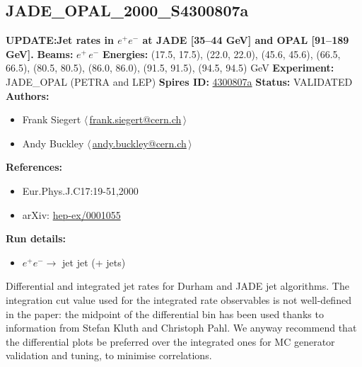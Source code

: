 
\clearpage

\subsection[JADE\_OPAL\_2000\_S4300807a]{JADE\_OPAL\_2000\_S4300807a\,\cite{Pfeifenschneider:1999rz}}
\textbf{UPDATE:Jet rates in $e^+e^-$ at JADE [35--44 GeV] and OPAL [91--189 GeV].}\newline
\textbf{Beams:} $e^+$\,$e^-$ \newline
\textbf{Energies:} (17.5, 17.5), (22.0, 22.0), (45.6, 45.6), (66.5, 66.5), (80.5, 80.5), (86.0, 86.0), (91.5, 91.5), (94.5, 94.5) GeV \newline
\textbf{Experiment:} JADE_OPAL (PETRA and LEP)\newline
\textbf{Spires ID:} \href{http://inspire-hep.net/search?p=find+key+4300807a}{4300807a}\newline
\textbf{Status:} VALIDATED\newline
\textbf{Authors:}
\begin{itemize}
  \item Frank Siegert $\langle\,$\href{mailto:frank.siegert@cern.ch}{frank.siegert@cern.ch}$\,\rangle$
  \item Andy Buckley $\langle\,$\href{mailto:andy.buckley@cern.ch}{andy.buckley@cern.ch}$\,\rangle$
\end{itemize}
\textbf{References:}
\begin{itemize}
  \item Eur.Phys.J.C17:19-51,2000
  \item arXiv: \href{http://arxiv.org/abs/hep-ex/0001055}{hep-ex/0001055}
\end{itemize}
\textbf{Run details:}
\begin{itemize}
\item $e^+ e^- \to$ jet jet (+ jets)
\end{itemize}

\noindent Differential and integrated jet rates for Durham and JADE jet algorithms.
The integration cut value used for the integrated rate observables is not well-defined in the paper: the midpoint of the differential bin has been used thanks to information from Stefan Kluth and Christoph Pahl.  We anyway recommend that the differential plots be preferred over the integrated ones for MC generator validation and tuning, to minimise correlations.

